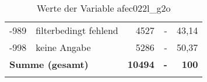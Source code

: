 \begin{longtable}{Xlrrr}
       -989 & filterbedingt fehlend & 4527 & - & 43,14 \\

       -998 & keine Angabe & 5286 & - & 50,37 \\

     \midrule
     \multicolumn{2}{l}{\textbf{Summe (gesamt)}} & \textbf{10494} & \textbf{-} & \textbf{100} \\
     \bottomrule
     \caption{Werte der Variable afec022l\_g2o}
     \end{longtable}
     
